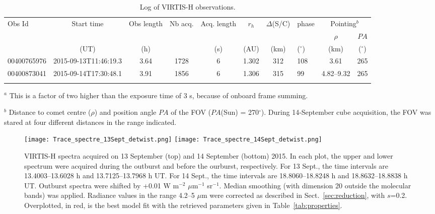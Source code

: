 \documentclass[a4paper,fleqn,usenatbib]{mnras}
\begin{document}
\begin{table*}
    \caption{Log of VIRTIS-H observations.}
    \label{tab:log}
    \begin{tabular}{lcccccclcc}
        \hline        \noalign{\smallskip}
Obs Id & Start time & Obs length & Nb acq. & Acq. length & $r_h$ & $\Delta$(S/C)   & phase & \multicolumn{2}{c}{Pointing$^b$} \\
&& &&&&&& $\rho$& $PA$ \\
& (UT) & (h)&  & (s) & (AU) & (km)  & ($^{\circ}$) & (km) &  ($^{\circ}$) \\
        \hline
        \noalign{\smallskip}
        00400765976 & 2015-09-13T11:46:19.3 &  3.64  & 1728 & 6 & 1.302 &   312 &   108
&  3.61 &  265  \\
  00400873041 & 2015-09-14T17:30:48.1 & 3.91 & 1856 & 6 & 1.306 &   315 &    99
&  4.82--9.32 &  265 \\
        \hline\noalign{\smallskip}
    \end{tabular}

{\raggedright
    $^a$ This is a factor of two higher than the exposure time of 3 s, because of onboard frame summing.

    $^b$ Distance to comet centre ($\rho$) and position angle $PA$ of the FOV ($PA$(Sun) = 270$^{\circ}$).  During 14-September cube acquisition, the FOV was stared at four different distances in the range indicated.

 }
\end{table*}

\begin{figure}
    \texttt{[image: Trace\_spectre\_13Sept\_detwist.png]}
    \texttt{[image: Trace\_spectre\_14Sept\_detwist.png]}
       \caption{VIRTIS-H spectra acquired on 13 September (top) and 14 September (bottom) 2015. In each plot, the upper and lower spectrum were acquired during the outburst and before the ourburst, respectively. For 13  Sept., the time intervals are 13.4003--13.6028 h and 13.7125--13.7968 h UT. For 14 Sept., the time intervals are 18.8060--18.8248 h and 18.8632--18.8838 h UT. Outburst spectra were shifted by +0.01 W m$^{-2}$ $\mu$m$^{-1}$ sr$^{-1}$. Median smoothing (with dimension 20 outside the molecular bands) was applied. Radiance values in the range 4.2--5 $\mu$m were corrected as described in Sect.~\ref{sec:reduction}, with $s$=0.2. Overplotted, in red, is the best model fit with the  retrieved parameters given in Table~\ref{tab:properties}.      }
    \label{fig:spectra}
\end{figure}
\end{document}
